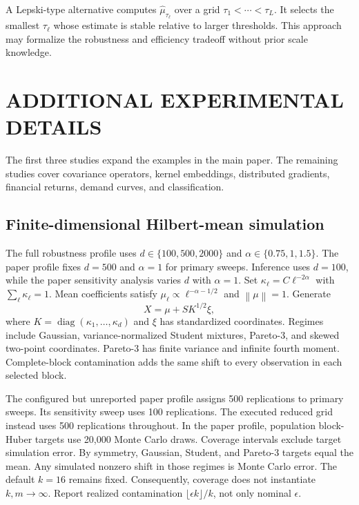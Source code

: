 \documentclass[twoside]{article}
\theoremstyle{definition}
\newcommand{\norm}[1]{\left\lVert #1\right\rVert}
\begin{document}
A Lepski-type alternative computes $\hat\mu_{\tau_\ell}$ over a grid $\tau_1<\cdots<\tau_L$. It selects the smallest $\tau_\ell$ whose estimate is stable relative to larger thresholds. This approach may formalize the robustness and efficiency tradeoff without prior scale knowledge.


\raggedbottom
\section{ADDITIONAL EXPERIMENTAL DETAILS}\label{app:experiments}

The first three studies expand the examples in the main paper. The remaining studies cover covariance operators, kernel embeddings, distributed gradients, financial returns, demand curves, and classification.

\subsection{Finite-dimensional Hilbert-mean simulation}

The full robustness profile uses $d\in\{100,500,2000\}$ and $\alpha\in\{0.75,1,1.5\}$. The paper profile fixes $d=500$ and $\alpha=1$ for primary sweeps. Inference uses $d=100$, while the paper sensitivity analysis varies $d$ with $\alpha=1$. Set $\kappa_\ell=C\ell^{-2\alpha}$ with $\sum_\ell\kappa_\ell=1$. Mean coefficients satisfy $\mu_\ell\propto\ell^{-\alpha-1/2}$ and $\norm\mu=1$. Generate
\[
    X=\mu+S K^{1/2}\xi,
\]
where $K=\operatorname{diag}(\kappa_1,\ldots,\kappa_d)$ and $\xi$ has standardized coordinates. Regimes include Gaussian, variance-normalized Student mixtures, Pareto-3, and skewed two-point coordinates. Pareto-3 has finite variance and infinite fourth moment. Complete-block contamination adds the same shift to every observation in each selected block.

The configured but unreported paper profile assigns 500 replications to primary sweeps. Its sensitivity sweep uses 100 replications. The executed reduced grid instead uses 500 replications throughout. In the paper profile, population block-Huber targets use 20,000 Monte Carlo draws. Coverage intervals exclude target simulation error. By symmetry, Gaussian, Student, and Pareto-3 targets equal the mean. Any simulated nonzero shift in those regimes is Monte Carlo error. The default $k=16$ remains fixed. Consequently, coverage does not instantiate $k,m\to\infty$. Report realized contamination $\lfloor\epsilon k\rfloor/k$, not only nominal $\epsilon$.
\end{document}
